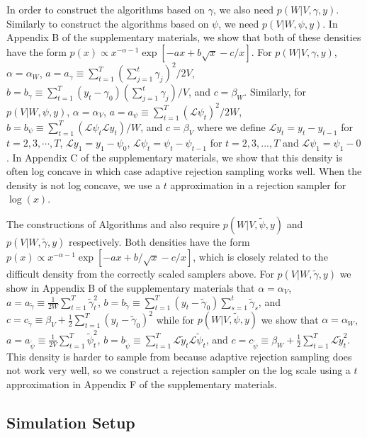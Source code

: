 \documentclass[12pt]{article}
\begin{document}
In order to construct the algorithms based on $\gamma$, we also need $p(W|V,\gamma,y)$. Similarly to construct the algorithms based on $\psi$, we need $p(V|W,\psi,y)$. In Appendix B of the supplementary materials, we show that both of these densities have the form $p(x)\propto x^{-\alpha-1}\exp\left[ -ax + b\sqrt{x} -c/x\right]$. For $p(W|V,\gamma,y)$, $\alpha=\alpha_W$, $a=a_\gamma \equiv \sum_{t=1}^T(\sum_{j=1}^t\gamma_j)^2/2V$, $b=b_\gamma \equiv\sum_{t=1}^T(y_t-\gamma_0)(\sum_{j=1}^t\gamma_j)/V$, and $c=\beta_W$. Similarly, for $p(V|W,\psi,y)$, $\alpha=\alpha_V$, $a=a_{\psi}\equiv\sum_{t=1}^T(\mathcal{L}\psi_t)^2/2W$, $b=b_{\psi}\equiv\sum_{t=1}^T(\mathcal{L}\psi_t\mathcal{L}y_t)/W$, and $c=\beta_V$ where we define $\mathcal{L}y_t=y_t-y_{t-1}$ for $t=2,3,\cdots,T$, $\mathcal{L}y_1=y_1 - \psi_0$, $\mathcal{L}\psi_t = \psi_t - \psi_{t-1}$ for $t=2,3,...,T$ and $\mathcal{L}\psi_1=\psi_1-0$. In Appendix C of the supplementary materials, we show that this density is often log concave in which case adaptive rejection sampling \citep{gilks1992adaptive} works well. When the density is not log concave, we use a $t$ approximation in a rejection sampler for $\log(x)$.

The constructions of Algorithms  and  also require $p(W|V,\tilde{\psi},y)$ and $p(V|W,\tilde{\gamma},y)$ respectively. Both densities have the form $p(x)\propto x^{-\alpha-1}\exp\left[ -ax + b/\sqrt{x} -c/x\right]$, which is closely related to the difficult density from the correctly scaled samplers above.  For $p(V|W,\tilde{\gamma},y)$ we show in Appendix B of the supplementary materials that $\alpha=\alpha_V$, $a = a_{\tilde{\gamma}}\equiv\frac{1}{2W}\sum_{t=1}^T\tilde{\gamma}_t^2$, $b =b_{\tilde{\gamma}}\equiv \sum_{t=1}^T(y_t - \tilde{\gamma}_0)\sum_{s=1}^t\tilde{\gamma}_s$, and $c =c_{\tilde{\gamma}}\equiv \beta_V + \frac{1}{2}\sum_{t=1}^T(y_t - \tilde{\gamma}_0)^2$ while for $p(W|V,\tilde{\psi},y)$ we show that $\alpha=\alpha_W$,   $a =a_{\tilde{\psi}}\equiv \frac{1}{2V}\sum_{t=1}^T\tilde{\psi}_t^2$,  $b =b_{\tilde{\psi}}\equiv \sum_{t=1}^T\mathcal{L}\tilde{y}_t\mathcal{L}\tilde{\psi}_t$, and $c =c_{\tilde{\psi}}\equiv \beta_W + \frac{1}{2}\sum_{t=1}^T\mathcal{L}\tilde{y}_t^2$. This density is harder to sample from because adaptive rejection sampling does not work very well, so we construct a rejection sampler on the log scale using a $t$ approximation in Appendix F of the supplementary materials.

\subsection{Simulation Setup}
\end{document}
